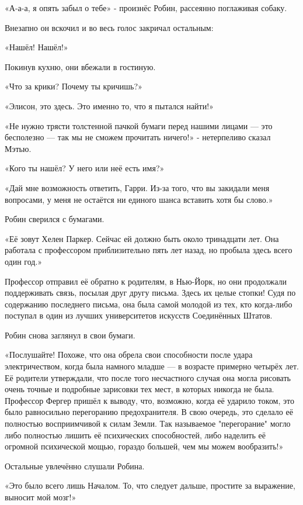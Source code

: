 \documentclass[a4paper,12pt]{book}
\begin{document}
\par
«А-а-а, я опять забыл о тебе» - произнёс Робин, рассеянно поглаживая собаку.
\par
Внезапно он вскочил и во весь голос закричал остальным:
\par
«Нашёл! Нашёл!»
\par
Покинув кухню, они вбежали в гостиную.
\par
«Что за крики? Почему ты кричишь?»
\par
«Элисон, это здесь. Это именно то, что я пытался найти!»
\par
«Не нужно трясти толстенной пачкой бумаги перед нашими лицами — это бесполезно — так мы не сможем прочитать ничего!» - нетерпеливо сказал Мэтью.
\par
«Кого ты нашёл? У него или неё есть имя?»
\par
«Дай мне возможность ответить, Гарри. Из-за того, что вы закидали меня вопросами, у меня не остаётся ни единого шанса вставить хотя бы слово.»
\par
Робин сверился с бумагами.
\par
«Её зовут Хелен Паркер. Сейчас ей должно быть около тринадцати лет. Она работала с профессором приблизительно пять лет назад, но пробыла здесь всего один год.»
\par
Профессор отправил её обратно к родителям, в Нью-Йорк, но они продолжали поддерживать связь, посылая друг другу письма. Здесь их целые стопки! Судя по содержанию последнего письма, она была самой молодой из тех, кто когда-либо поступал в один из лучших университетов искусств Соединённых Штатов.
\par
Робин снова заглянул в свои бумаги.
\par
«Послушайте! Похоже, что она обрела свои способности после удара электричеством, когда была намного младше — в возрасте примерно четырёх лет. Её родители утверждали, что после того несчастного случая она могла рисовать очень точные и подробные зарисовки тех мест, в которых никогда не была. Профессор Фергер пришёл к выводу, что, возможно, когда её ударило током, это было равносильно перегоранию предохранителя. В свою очередь, это сделало её полностью восприимчивой к силам Земли. Так называемое "перегорание" могло либо полностью лишить её психических способностей, либо наделить её огромной психической мощью, гораздо большей, чем мы можем вообразить!»
\par
Остальные увлечённо слушали Робина.
\par
«Это было всего лишь Началом. То, что следует дальше, простите за выражение, выносит мой мозг!»
\end{document}
